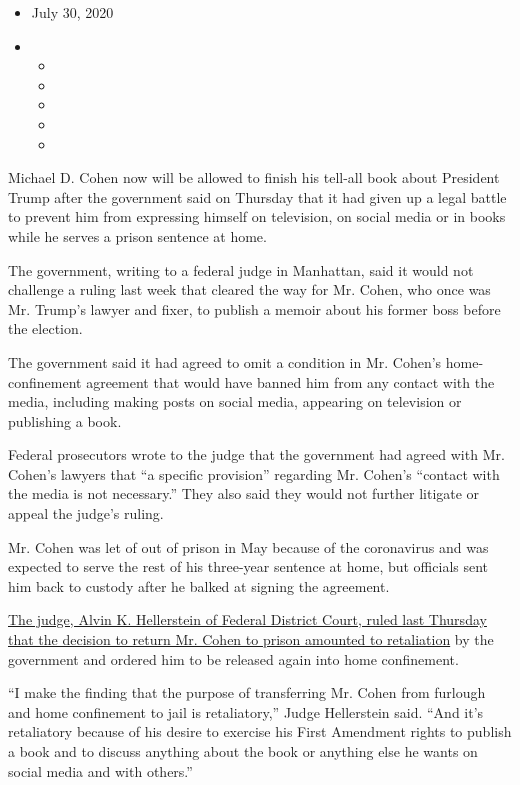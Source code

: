 \begin{itemize}
\item
  July 30, 2020
\item
  \begin{itemize}
  \item
  \item
  \item
  \item
  \item
  \end{itemize}
\end{itemize}

Michael D. Cohen now will be allowed to finish his tell-all book about
President Trump after the government said on Thursday that it had given
up a legal battle to prevent him from expressing himself on television,
on social media or in books while he serves a prison sentence at home.

The government, writing to a federal judge in Manhattan, said it would
not challenge a ruling last week that cleared the way for Mr. Cohen, who
once was Mr. Trump's lawyer and fixer, to publish a memoir about his
former boss before the election.

The government said it had agreed to omit a condition in Mr. Cohen's
home-confinement agreement that would have banned him from any contact
with the media, including making posts on social media, appearing on
television or publishing a book.

Federal prosecutors wrote to the judge that the government had agreed
with Mr. Cohen's lawyers that ``a specific provision'' regarding Mr.
Cohen's ``contact with the media is not necessary.'' They also said they
would not further litigate or appeal the judge's ruling.

Mr. Cohen was let of out of prison in May because of the coronavirus and
was expected to serve the rest of his three-year sentence at home, but
officials sent him back to custody after he balked at signing the
agreement.

\href{https://www.nytimes.com/2020/07/23/nyregion/michael-cohen-trump-book.html}{The
judge, Alvin K. Hellerstein of Federal District Court, ruled last
Thursday that the decision to return Mr. Cohen to prison amounted to
retaliation} by the government and ordered him to be released again into
home confinement.

``I make the finding that the purpose of transferring Mr. Cohen from
furlough and home confinement to jail is retaliatory,'' Judge
Hellerstein said. ``And it's retaliatory because of his desire to
exercise his First Amendment rights to publish a book and to discuss
anything about the book or anything else he wants on social media and
with others.''

